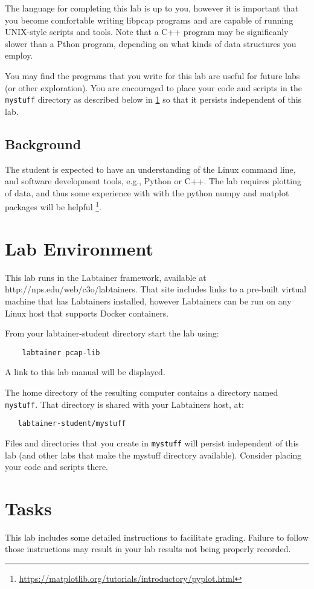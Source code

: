 The language for completing this lab is up to you, however it is important that you become comfortable writing libpcap programs and are capable of running UNIX-style scripts and tools.  Note that a C++ program may be significanly slower
than a Pthon program, depending on what kinds of data structures you employ.

You may find the programs that you write for this lab are useful for future labs (or other exploration).  You are encouraged to place your code and scripts
in the {\tt mystuff} directory as described below in \ref{environment} so that it persists independent of this lab.

\subsection {Background}
The student is expected to have an understanding of the Linux command line, and software development tools, e.g., Python or C++.
The lab requires plotting of data, and thus some experience with with the python numpy and matplot packages will be helpful \footnote{\url{https://matplotlib.org/tutorials/introductory/pyplot.html}}.

\section{Lab Environment}
\label{environment}
This lab runs in the Labtainer framework,
available at http://nps.edu/web/c3o/labtainers.
That site includes links to a pre-built virtual machine
that has Labtainers installed, however Labtainers can
be run on any Linux host that supports Docker containers.

From your labtainer-student directory start the lab using:
\begin{verbatim}
    labtainer pcap-lib
\end{verbatim}
\noindent A link to this lab manual will be displayed.  

The home directory of the resulting computer contains a directory named {\tt mystuff}.  That directory is shared with your Labtainers host,
at:
\begin{verbatim}
   labtainer-student/mystuff
\end{verbatim}
\noindent Files and directories that you create in {\tt mystuff} will persist independent of this lab (and other labs that make the mystuff
directory available).  Consider placing your code and scripts there.

\section{Tasks}
This lab includes some detailed instructions to facilitate grading.  Failure to follow those instructions may result in your
lab results not being properly recorded.
